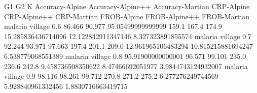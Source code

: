 G1 G2 K Accuracy-Alpine Accuracy-Alpine++ Accuracy-Martian CRP-Alpine CRP-Alpine++ CRP-Martian FROB-Alpine FROB-Alpine++ FROB-Martian
malaria village 0.6 86.466 90.977 95.05499999999999 159.1 167.4 174.9 15.285836436714096 12.122842911347146 8.327323891855574
malaria village 0.7 92.244 93.971 97.663 197.4 201.1 209.0 12.961965106483294 10.815215881694247 6.538779068551389
malaria village 0.8 95.91900000000001 96.571 99.101 235.0 236.6 242.8 9.458736508350622 8.47466692051977 3.9844743124932007
malaria village 0.9 98.116 98.261 99.712 270.8 271.2 275.2 6.277276249744569 5.928840961332456 1.8830716663419715
